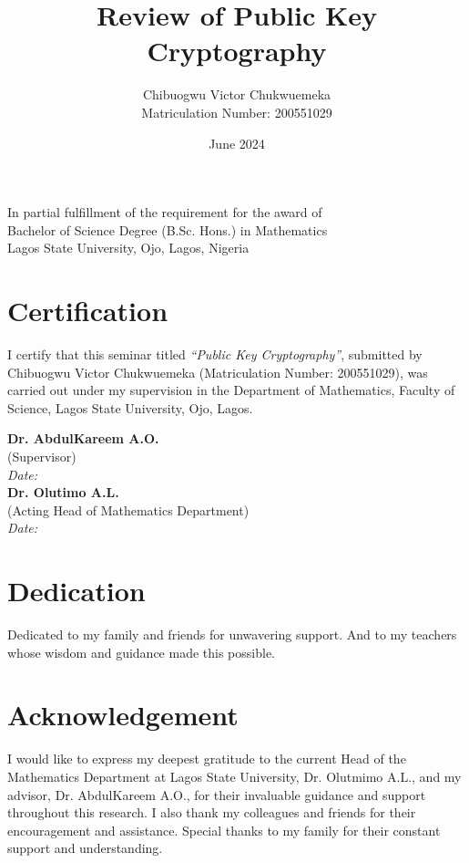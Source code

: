\documentclass[12pt]{article}
\title{Review of Public Key Cryptography}
\author{Chibuogwu Victor Chukwuemeka \\ Matriculation Number: 200551029}
\date{June 2024}
\begin{document}
\maketitle

\begin{center}
In partial fulfillment of the requirement for the award of \\
Bachelor of Science Degree (B.Sc. Hons.) in Mathematics \\
Lagos State University, Ojo, Lagos, Nigeria
\end{center}

\vfill
\newpage

\section {Certification}
I certify that this seminar titled \textit{``Public Key Cryptography''}, submitted by Chibuogwu Victor Chukwuemeka (Matriculation Number: 200551029), was carried out under my supervision in the Department of Mathematics, Faculty of Science, Lagos State University, Ojo, Lagos.

\begin{flushright}
\textbf{Dr. AbdulKareem A.O.}\\
(Supervisor)\\
\textit{Date: \underline{\hspace{2cm}}} \\
\textbf{Dr. Olutimo A.L.}\\
(Acting Head of Mathematics Department)\\
\textit{Date: \underline{\hspace{2cm}}}
\end{flushright}

\newpage

\section*{Dedication}
Dedicated to my family and friends for unwavering support. And to my teachers whose wisdom and guidance made this possible.

\newpage

\section*{Acknowledgement}
I would like to express my deepest gratitude to the current Head of the Mathematics Department at Lagos State University, Dr. Olutmimo A.L., and my advisor, Dr. AbdulKareem A.O., for their invaluable guidance and support throughout this research. I also thank my colleagues and friends for their encouragement and assistance. Special thanks to my family for their constant support and understanding.
\end{document}
